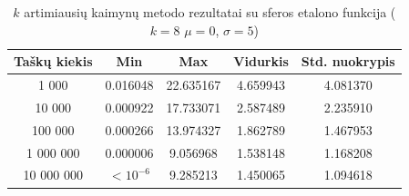 \begin{table}[H]
    \centering
    \begin{tabular}{|c|c|c|c|c|}
        \hline
        \textbf{Taškų kiekis} & \textbf{Min} & \textbf{Max} & \textbf{Vidurkis} & \textbf{Std. nuokrypis} \\ \hline
        1 000        & 0.016048 & 22.635167 & 4.659943 & 4.081370 \\ \hline
        10 000       & 0.000922 & 17.733071 & 2.587489 & 2.235910 \\ \hline
        100 000      & 0.000266 & 13.974327 & 1.862789 & 1.467953 \\ \hline
        1 000 000    & 0.000006 & 9.056968 & 1.538148 & 1.168208 \\ \hline
        10 000 000   & $<10^{-6}$ & 9.285213 & 1.450065 & 1.094618 \\ \hline
    \end{tabular}
    \caption{$k$ artimiausių kaimynų metodo rezultatai su sferos etalono funkcija ($k = 8$ $\mu = 0$, $\sigma = 5$)}
\end{table}